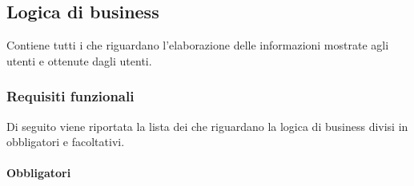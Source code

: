 \subsection{Logica di business}
Contiene tutti i  che riguardano l'elaborazione delle informazioni mostrate agli utenti e ottenute dagli utenti.

\subsubsection{Requisiti funzionali}
Di seguito viene riportata la lista dei  che riguardano la logica di business divisi in  obbligatori e  facoltativi.


\paragraph{Obbligatori}
